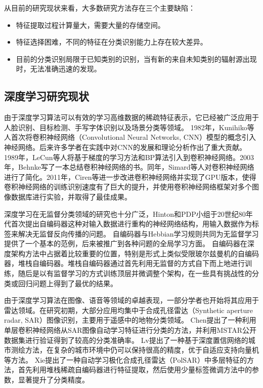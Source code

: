 从目前的研究现状来看，大多数研究方法存在三个主要缺陷：
\begin{itemize}
	\item 特征提取过程计算量大，需要大量的存储空间。
	\item 特征选择困难，不同的特征在分类识别能力上存在较大差异。
	\item 目前的分类识别局限于已知类别的识别，当有新的来自未知类别的辐射源出现时，无法准确迅速的发现。
\end{itemize}

\subsection{深度学习研究现状}
由于深度学习算法可以有效的学习高维数据的稀疏特征表示，它已经被广泛应用于人脸识别、目标检测、手写字体识别以及场景分类等领域。
1982年，Kunihiko等人首次将卷积神经网络（Convolutional Neural Networks, CNN）模型的概念引入神经网络。后来许多学者在实践中对CNN的发展和理论分析作出了重大贡献。1989年，LeCun等人将基于梯度的学习方法和BP算法引入到卷积神经网络。2003年，Behnke写了一本总结卷积神经网络的书。同年，Simard等人对卷积神经网络进行了简化。2011年，Ciren等进一步改进卷积神经网络并实现了GPU版本，使得卷积神经网络的训练识别速度有了巨大的提升，并使用卷积神经网络框架对多个图像数据库进行实验，并取得了最佳成果。

深度学习在无监督分类领域的研究也十分广泛，Hinton和PDP小组于20世纪80年代首次提出自编码器这种对输入数据进行重构的神经网络结构，用输入数据作为标签来解决无监督反向传播的问题。
自编码器与Hebbian学习规则共同为无监督学习提供了一个基本的范例，后来被推广到各种问题的全局学习方面。
自编码器在深度架构方法中占据着比较重要的位置，特别是形式上类似受限玻尔兹曼机的自编码器，堆栈自编码器。堆栈自编码器通过首先利用无监督的方式自下而上地进行训练，随后是以有监督学习的方式训练顶层并微调整个架构，在一些具有挑战性的分类或回归问题上得到了最优的结果。

由于深度学习算法在图像、语音等领域的卓越表现，一部分学者也开始将其应用于雷达领域。在研究初期，大部分应用均集中于合成孔径雷达（Synthetic aperture radar, SAR）图像识别，主要用于遥感中的地物分类领域。
Chen提出了一种利用单层卷积神经网络从SAR图像自动学习特征进行分类的方法，并利用MSTAR公开数据集进行验证得到了较高的分类准确率。
Lv提出了一种基于深度置信网络的城市测绘方法，在复杂的城市环境中仍可以保持很高的精度，优于自适应支持向量机等方法。
Xie提出了一种自动学习极化合成孔径雷达（PolSAR）中多层特征的方法，首先利用堆栈稀疏自编码器进行特征提取，然后使用少量标签微调方法中的参数，显著提升了分类精度。

